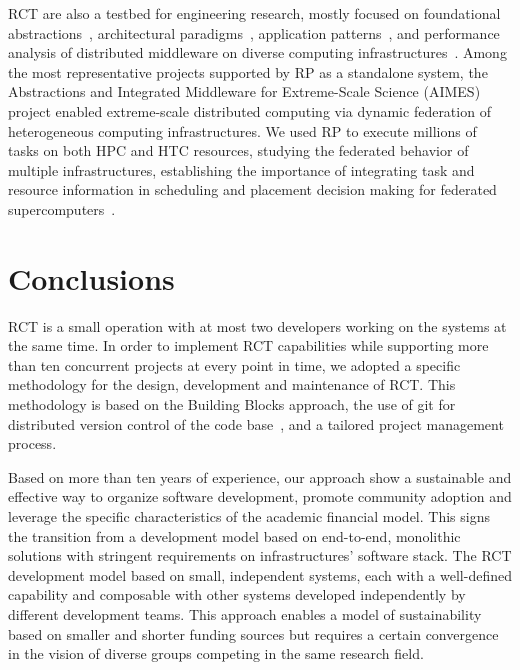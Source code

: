 \documentclass[preprint,12pt, a4paper]{elsarticle}
\begin{document}

RCT are also a testbed for engineering research, mostly focused on
foundational abstractions~\cite{turilli2017evaluating}, architectural
paradigms~\cite{turilli2018comprehensive}, application
patterns~\cite{balasubramanian2016extasy,balasubramanian2018harnessing}, and
performance analysis of distributed middleware on diverse computing
infrastructures~\cite{turilli2017evaluating,dakka2018high}. Among the most
representative projects supported by RP as a standalone system, the
Abstractions and Integrated Middleware for Extreme-Scale Science (AIMES)
project enabled extreme-scale distributed computing via dynamic federation of
heterogeneous computing infrastructures. We used RP to execute millions of
tasks on both HPC and HTC resources, studying the federated behavior of
multiple infrastructures, establishing the importance of integrating task and
resource information in scheduling and placement decision making for
federated supercomputers~\cite{turilli2016integrating}.


\section{Conclusions}\label{sec:conclusions}

RCT is a small operation with at most two developers working on the systems
at the same time. In order to implement RCT capabilities while supporting
more than ten concurrent projects at every point in time, we adopted a
specific methodology for the design, development and maintenance of RCT\@.
This methodology is based on the Building Blocks approach, the use of git for
distributed version control of the code base~\cite{github-rct}, and a
tailored project management process.

Based on more than ten years of experience, our approach show a sustainable
and effective way to organize software development, promote community
adoption and leverage the specific characteristics of the academic financial
model. This signs the transition from a development model based on
end-to-end, monolithic solutions with stringent requirements on
infrastructures' software stack. The RCT development model based on small,
independent systems, each with a well-defined capability and composable with
other systems developed independently by different development teams. This
approach enables a model of sustainability based on smaller and shorter
funding sources but requires a certain convergence in the vision of diverse
groups competing in the same research field.
\end{document}
